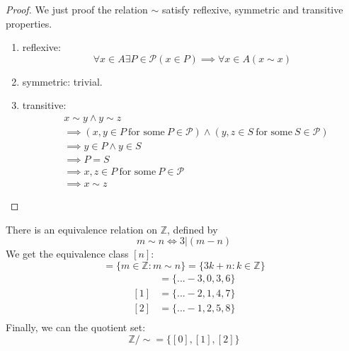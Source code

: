 \begin{proof}
    We just proof the relation $\sim$ satisfy reflexive, symmetric and transitive properties.
    \begin{enumerate}

        \item reflexive:
        \begin{equation*}
            \forall x \in A \exists P \in \mathcal{P} (x \in P) \implies \forall x \in A (x \sim x)
        \end{equation*}
        \item symmetric: trivial.
        \item transitive:
        \begin{align*}
            &x \sim y \land y \sim z\\
            &\implies (x,y \in P \ \text{for some}\ P \in \mathcal{P})\land (y,z \in S \ \text{for some}\ S \in \mathcal{P})\\
            &\implies y \in P \land y \in S\\
            &\implies P = S\\
            &\implies x,z \in P \ \text{for some}\ P \in \mathcal{P}\\
            &\implies x \sim z
        \end{align*}

    \end{enumerate}
\end{proof}

\begin{examples}
    There is an equivalence relation on $\mathbb{Z}$, defined by
    \begin{equation*}
        m \sim n \iff 3 | (m - n)
    \end{equation*}
    We get the equivalence class $[n]$:
    \begin{equation*}
        [n] = \{m \in \mathbb{Z}: m \sim n\} = \{3k+n: k \in \mathbb{Z}\}
    \end{equation*}
    \begin{align*}
        [0] &= \{...-3,0,3,6\}\\
        [1] &= \{...-2,1,4,7\}\\
        [2] &= \{...-1,2,5,8\}\\
    \end{align*}
    Finally, we can the quotient set:
    \begin{equation*}
        \mathbb{Z}/\sim = \{[0],[1],[2]\}
    \end{equation*}
\end{examples}

